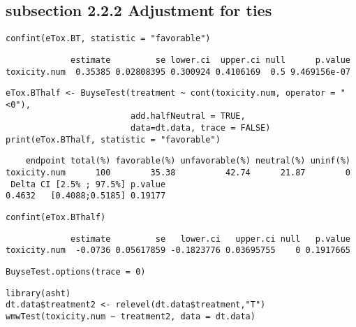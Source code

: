 \documentclass[12pt]{article}
\begin{document}
\subsection{subsection 2.2.2 Adjustment for ties}
\label{sec:org1180696}

\lstset{language=r,label= ,caption= ,captionpos=b,numbers=none}
\begin{lstlisting}
confint(eTox.BT, statistic = "favorable")
\end{lstlisting}

\begin{verbatim}
             estimate         se lower.ci  upper.ci null      p.value
toxicity.num  0.35385 0.02808395 0.300924 0.4106169  0.5 9.469156e-07
\end{verbatim}



\lstset{language=r,label= ,caption= ,captionpos=b,numbers=none}
\begin{lstlisting}
eTox.BThalf <- BuyseTest(treatment ~ cont(toxicity.num, operator = "<0"),
                         add.halfNeutral = TRUE,
                         data=dt.data, trace = FALSE)
print(eTox.BThalf, statistic = "favorable")
\end{lstlisting}

\begin{verbatim}
    endpoint total(%) favorable(%) unfavorable(%) neutral(%) uninf(%)
toxicity.num      100        35.38          42.74      21.87        0
 Delta CI [2.5% ; 97.5%] p.value
0.4632   [0.4088;0.5185] 0.19177
\end{verbatim}


\lstset{language=r,label= ,caption= ,captionpos=b,numbers=none}
\begin{lstlisting}
confint(eTox.BThalf)
\end{lstlisting}

\begin{verbatim}
             estimate         se   lower.ci   upper.ci null   p.value
toxicity.num  -0.0736 0.05617859 -0.1823776 0.03695755    0 0.1917665
\end{verbatim}



\lstset{language=r,label= ,caption= ,captionpos=b,numbers=none}
\begin{lstlisting}
BuyseTest.options(trace = 0)
\end{lstlisting}

\lstset{language=r,label= ,caption= ,captionpos=b,numbers=none}
\begin{lstlisting}
library(asht)
dt.data$treatment2 <- relevel(dt.data$treatment,"T")
wmwTest(toxicity.num ~ treatment2, data = dt.data)
\end{lstlisting}
\end{document}
